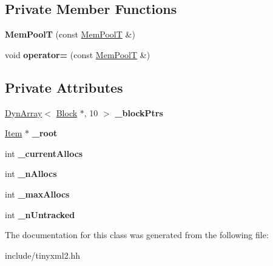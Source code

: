 \subsection*{Private Member Functions}
\begin{DoxyCompactItemize}
\item 
{\bfseries Mem\+PoolT} (const \hyperlink{classtinyxml2_1_1MemPoolT}{Mem\+PoolT} \&)\hypertarget{classtinyxml2_1_1MemPoolT_afa8770a0645d28bd849e7e5aefb326ed}{}\label{classtinyxml2_1_1MemPoolT_afa8770a0645d28bd849e7e5aefb326ed}

\item 
void {\bfseries operator=} (const \hyperlink{classtinyxml2_1_1MemPoolT}{Mem\+PoolT} \&)\hypertarget{classtinyxml2_1_1MemPoolT_a12ba6478e385244beb2ca3947879fd24}{}\label{classtinyxml2_1_1MemPoolT_a12ba6478e385244beb2ca3947879fd24}

\end{DoxyCompactItemize}
\subsection*{Private Attributes}
\begin{DoxyCompactItemize}
\item 
\hyperlink{classtinyxml2_1_1DynArray}{Dyn\+Array}$<$ \hyperlink{structtinyxml2_1_1MemPoolT_1_1Block}{Block} $\ast$, 10 $>$ {\bfseries \+\_\+block\+Ptrs}\hypertarget{classtinyxml2_1_1MemPoolT_a028d833de2bf5e6257b4b27a68702a84}{}\label{classtinyxml2_1_1MemPoolT_a028d833de2bf5e6257b4b27a68702a84}

\item 
\hyperlink{uniontinyxml2_1_1MemPoolT_1_1Item}{Item} $\ast$ {\bfseries \+\_\+root}\hypertarget{classtinyxml2_1_1MemPoolT_aff60ad785be00814e442e53fb4462688}{}\label{classtinyxml2_1_1MemPoolT_aff60ad785be00814e442e53fb4462688}

\item 
int {\bfseries \+\_\+current\+Allocs}\hypertarget{classtinyxml2_1_1MemPoolT_afa908fd62011c6e633d7af196d667e9d}{}\label{classtinyxml2_1_1MemPoolT_afa908fd62011c6e633d7af196d667e9d}

\item 
int {\bfseries \+\_\+n\+Allocs}\hypertarget{classtinyxml2_1_1MemPoolT_acd5867e06ad91a655f3c9f95ca163e9b}{}\label{classtinyxml2_1_1MemPoolT_acd5867e06ad91a655f3c9f95ca163e9b}

\item 
int {\bfseries \+\_\+max\+Allocs}\hypertarget{classtinyxml2_1_1MemPoolT_aaf3960c9e30197aeb1c0af271c297db9}{}\label{classtinyxml2_1_1MemPoolT_aaf3960c9e30197aeb1c0af271c297db9}

\item 
int {\bfseries \+\_\+n\+Untracked}\hypertarget{classtinyxml2_1_1MemPoolT_a5048ad99f7350f7224b13cf85fbff151}{}\label{classtinyxml2_1_1MemPoolT_a5048ad99f7350f7224b13cf85fbff151}

\end{DoxyCompactItemize}


The documentation for this class was generated from the following file\+:\begin{DoxyCompactItemize}
\item 
include/tinyxml2.\+hh\end{DoxyCompactItemize}
